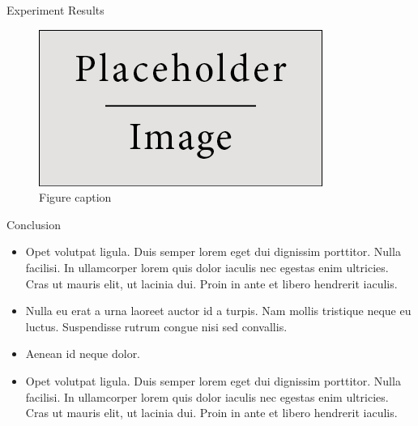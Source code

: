 \documentclass[final,hyperref={pdfpagelabels=false}]{beamer}
\begin{document}
\begin{frame}[t]
\begin{columns}[t]
\begin{column}{.48\textwidth}
\begin{block}{Experiment Results}

\begin{figure}
\includegraphics[width=0.8\linewidth]{placeholder.jpg}
\caption{Figure caption}
\end{figure}

\end{block}


\begin{block}{Conclusion}

\begin{itemize}
\item Opet volutpat ligula. Duis semper lorem eget dui dignissim porttitor. Nulla facilisi. In ullamcorper lorem quis dolor iaculis nec egestas enim ultricies. Cras ut mauris elit, ut lacinia dui. Proin in ante et libero hendrerit iaculis.
\item Nulla eu erat a urna laoreet auctor id a turpis. Nam mollis tristique neque eu luctus. Suspendisse rutrum congue nisi sed convallis. 
\item Aenean id neque dolor.
\item Opet volutpat ligula. Duis semper lorem eget dui dignissim porttitor. Nulla facilisi. In ullamcorper lorem quis dolor iaculis nec egestas enim ultricies. Cras ut mauris elit, ut lacinia dui. Proin in ante et libero hendrerit iaculis.
\end{itemize}

\end{block}



\end{column}
\end{columns}
\end{frame}
\end{document}

